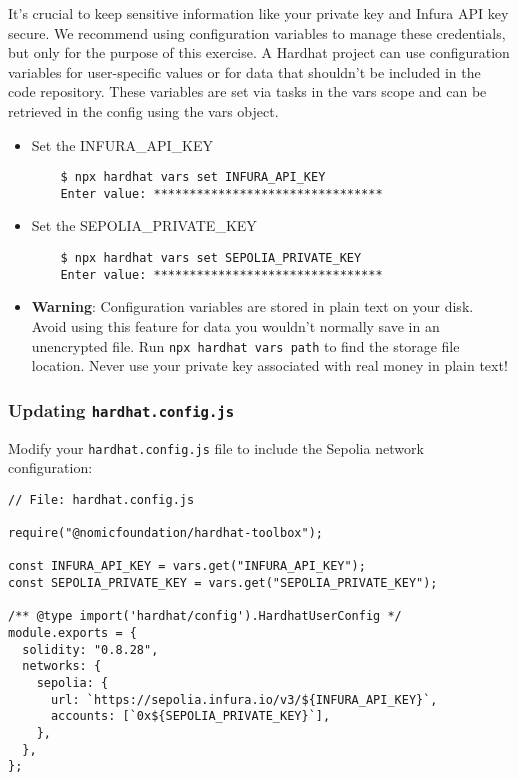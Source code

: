 \documentclass[12pt]{article}
\begin{document}
It's crucial to keep sensitive information like your private key and Infura API
key secure. We recommend using configuration variables to manage these
credentials, but only for the purpose of this exercise. A Hardhat project can use
configuration variables for user-specific values or for data that shouldn't be
included in the code repository. These variables are set via tasks in the vars
scope and can be retrieved in the config using the vars object.

\begin{itemize}
    \item Set the INFURA\_API\_KEY

          \begin{verbatim}
    $ npx hardhat vars set INFURA_API_KEY
    Enter value: ********************************
\end{verbatim}

    \item Set the SEPOLIA\_PRIVATE\_KEY

          \begin{verbatim}
    $ npx hardhat vars set SEPOLIA_PRIVATE_KEY
    Enter value: ********************************
\end{verbatim}

\end{itemize}

\begin{itemize}
    \item \textbf{Warning}: Configuration variables are stored in plain text on your disk. Avoid using this feature for data you wouldn't normally save in an unencrypted file. Run \texttt{npx hardhat vars path} to find the storage file location. Never use your private key associated with real money in plain text!
\end{itemize}

\subsubsection*{Updating \texttt{hardhat.config.js}}

Modify your \texttt{hardhat.config.js} file to include the Sepolia network
configuration:

\noindent
\begin{minipage}[c]{\textwidth}
    \begin{verbatim}
// File: hardhat.config.js

require("@nomicfoundation/hardhat-toolbox");

const INFURA_API_KEY = vars.get("INFURA_API_KEY");
const SEPOLIA_PRIVATE_KEY = vars.get("SEPOLIA_PRIVATE_KEY");

/** @type import('hardhat/config').HardhatUserConfig */
module.exports = {
  solidity: "0.8.28",
  networks: {
    sepolia: {
      url: `https://sepolia.infura.io/v3/${INFURA_API_KEY}`,
      accounts: [`0x${SEPOLIA_PRIVATE_KEY}`],
    },
  },
};
\end{verbatim}
\end{minipage}
\end{document}
